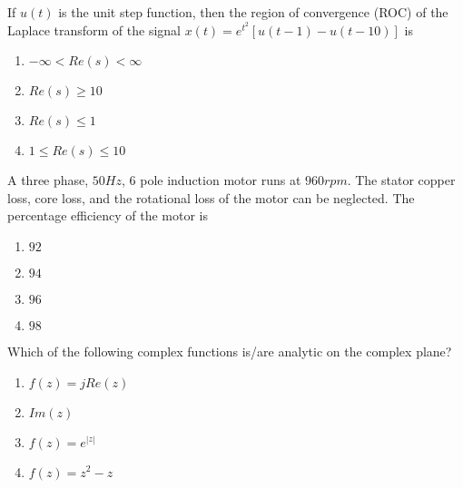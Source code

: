\item If $u(t)$ is the unit step function, then the region of convergence (ROC) of the 
Laplace transform of the signal $x(t)=e^{t^2}[u(t-1)-u(t-10)]$ is
\begin{enumerate}
    \item $-\infty < Re(s) <\infty$
    \item $Re(s)\geq 10$
    \item $Re(s)\leq1$
    \item $1\leq Re(s) \leq10$ \\
\end{enumerate}
\item A three phase, $50 Hz$, $6$ pole induction motor runs at $960 rpm$. The stator copper 
loss, core loss, and the rotational loss of the motor can be neglected. The percentage 
efficiency of the motor is
\begin{enumerate}
    \item $92$
    \item $94$
    \item $96$
    \item $98$\\
\end{enumerate}

\item Which of the following complex functions is/are analytic on the complex plane? 
\begin{enumerate}
    \item $f(z)=jRe(z)$
    \item $Im(z)$
    \item $f(z)=e^{|z|}$
    \item $f(z)=z^2-z$ \\
\end{enumerate}


